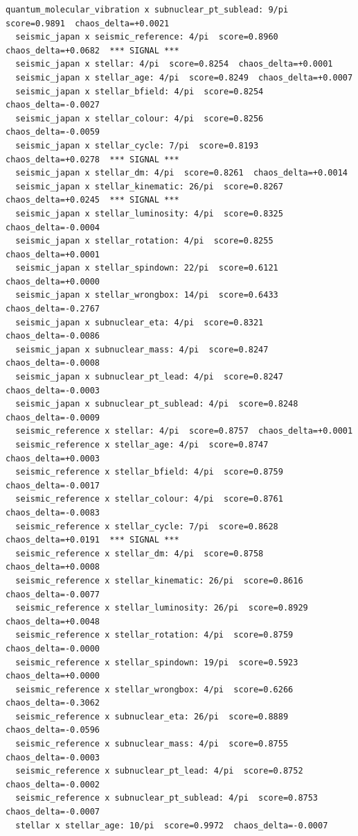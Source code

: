 \documentclass[11pt, letterpaper, openany]{book}
\begin{document}
\begin{empiricalbox}
\begin{lstlisting}[style=terminal]
  quantum_molecular_vibration x subnuclear_pt_sublead: 9/pi  score=0.9891  chaos_delta=+0.0021
  seismic_japan x seismic_reference: 4/pi  score=0.8960  chaos_delta=+0.0682  *** SIGNAL ***
  seismic_japan x stellar: 4/pi  score=0.8254  chaos_delta=+0.0001
  seismic_japan x stellar_age: 4/pi  score=0.8249  chaos_delta=+0.0007
  seismic_japan x stellar_bfield: 4/pi  score=0.8254  chaos_delta=-0.0027
  seismic_japan x stellar_colour: 4/pi  score=0.8256  chaos_delta=-0.0059
  seismic_japan x stellar_cycle: 7/pi  score=0.8193  chaos_delta=+0.0278  *** SIGNAL ***
  seismic_japan x stellar_dm: 4/pi  score=0.8261  chaos_delta=+0.0014
  seismic_japan x stellar_kinematic: 26/pi  score=0.8267  chaos_delta=+0.0245  *** SIGNAL ***
  seismic_japan x stellar_luminosity: 4/pi  score=0.8325  chaos_delta=-0.0004
  seismic_japan x stellar_rotation: 4/pi  score=0.8255  chaos_delta=+0.0001
  seismic_japan x stellar_spindown: 22/pi  score=0.6121  chaos_delta=+0.0000
  seismic_japan x stellar_wrongbox: 14/pi  score=0.6433  chaos_delta=-0.2767
  seismic_japan x subnuclear_eta: 4/pi  score=0.8321  chaos_delta=-0.0086
  seismic_japan x subnuclear_mass: 4/pi  score=0.8247  chaos_delta=-0.0008
  seismic_japan x subnuclear_pt_lead: 4/pi  score=0.8247  chaos_delta=-0.0003
  seismic_japan x subnuclear_pt_sublead: 4/pi  score=0.8248  chaos_delta=-0.0009
  seismic_reference x stellar: 4/pi  score=0.8757  chaos_delta=+0.0001
  seismic_reference x stellar_age: 4/pi  score=0.8747  chaos_delta=+0.0003
  seismic_reference x stellar_bfield: 4/pi  score=0.8759  chaos_delta=-0.0017
  seismic_reference x stellar_colour: 4/pi  score=0.8761  chaos_delta=-0.0083
  seismic_reference x stellar_cycle: 7/pi  score=0.8628  chaos_delta=+0.0191  *** SIGNAL ***
  seismic_reference x stellar_dm: 4/pi  score=0.8758  chaos_delta=+0.0008
  seismic_reference x stellar_kinematic: 26/pi  score=0.8616  chaos_delta=-0.0077
  seismic_reference x stellar_luminosity: 26/pi  score=0.8929  chaos_delta=+0.0048
  seismic_reference x stellar_rotation: 4/pi  score=0.8759  chaos_delta=-0.0000
  seismic_reference x stellar_spindown: 19/pi  score=0.5923  chaos_delta=+0.0000
  seismic_reference x stellar_wrongbox: 4/pi  score=0.6266  chaos_delta=-0.3062
  seismic_reference x subnuclear_eta: 26/pi  score=0.8889  chaos_delta=-0.0596
  seismic_reference x subnuclear_mass: 4/pi  score=0.8755  chaos_delta=-0.0003
  seismic_reference x subnuclear_pt_lead: 4/pi  score=0.8752  chaos_delta=-0.0002
  seismic_reference x subnuclear_pt_sublead: 4/pi  score=0.8753  chaos_delta=-0.0007
  stellar x stellar_age: 10/pi  score=0.9972  chaos_delta=-0.0007

\end{lstlisting}
\end{empiricalbox}
\end{document}
